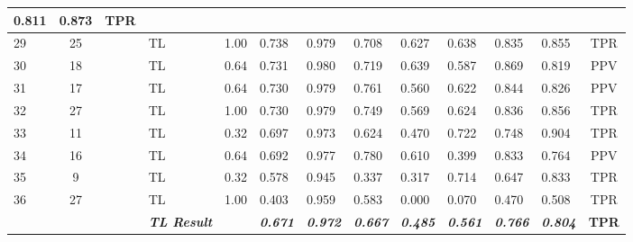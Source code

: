 \begin{table}[H]
{\begin{tabular}{lcc|l|c|l|l|l|l|l|l|l|c|}
    0.811 &
    0.873 &
    TPR \\ \hline
  \multicolumn{1}{|l|}{29} &
    \multicolumn{1}{c|}{25} &
    \cellcolor[HTML]{00A9CE}{\color[HTML]{FFFFFF} RB} &
    TL &
    1.00 &
    0.738 &
    0.979 &
    0.708 &
    0.627 &
    0.638 &
    0.835 &
    0.855 &
    TPR \\ \hline
  \multicolumn{1}{|l|}{30} &
    \multicolumn{1}{c|}{18} &
    \cellcolor[HTML]{00A9CE}{\color[HTML]{FFFFFF} RB} &
    TL &
    0.64 &
    0.731 &
    0.980 &
    0.719 &
    0.639 &
    0.587 &
    0.869 &
    0.819 &
    PPV \\ \hline
  \multicolumn{1}{|l|}{31} &
    \multicolumn{1}{c|}{17} &
    \cellcolor[HTML]{00A9CE}{\color[HTML]{FFFFFF} RB} &
    TL &
    0.64 &
    0.730 &
    0.979 &
    0.761 &
    0.560 &
    0.622 &
    0.844 &
    0.826 &
    PPV \\ \hline
  \multicolumn{1}{|l|}{32} &
    \multicolumn{1}{c|}{27} &
    \cellcolor[HTML]{00A9CE}{\color[HTML]{FFFFFF} RB} &
    TL &
    1.00 &
    0.730 &
    0.979 &
    0.749 &
    0.569 &
    0.624 &
    0.836 &
    0.856 &
    TPR \\ \hline
  \multicolumn{1}{|l|}{33} &
    \multicolumn{1}{c|}{11} &
    \cellcolor[HTML]{00A9CE}{\color[HTML]{FFFFFF} RB} &
    TL &
    0.32 &
    0.697 &
    0.973 &
    0.624 &
    0.470 &
    0.722 &
    0.748 &
    0.904 &
    TPR \\ \hline
  \multicolumn{1}{|l|}{34} &
    \multicolumn{1}{c|}{16} &
    \cellcolor[HTML]{00A9CE}{\color[HTML]{FFFFFF} RB} &
    TL &
    0.64 &
    0.692 &
    0.977 &
    0.780 &
    0.610 &
    0.399 &
    0.833 &
    0.764 &
    PPV \\ \hline
  \multicolumn{1}{|l|}{35} &
    \multicolumn{1}{c|}{9} &
    \cellcolor[HTML]{00A9CE}{\color[HTML]{FFFFFF} RB} &
    TL &
    0.32 &
    0.578 &
    0.945 &
    0.337 &
    0.317 &
    0.714 &
    0.647 &
    0.833 &
    TPR \\ \hline
  \multicolumn{1}{|l|}{36} &
    \multicolumn{1}{c|}{27} &
    \cellcolor[HTML]{00A9CE}{\color[HTML]{FFFFFF} RB} &
    TL &
    1.00 &
    0.403 &
    0.959 &
    0.583 &
    0.000 &
    0.070 &
    0.470 &
    0.508 &
    TPR \\ \hline
   &
     &
     &
    \textit{\textbf{TL Result}} &
     &
    \textit{\textbf{0.671}} &
    \textit{\textbf{0.972}} &
    \textit{\textbf{0.667}} &
    \textit{\textbf{0.485}} &
    \textit{\textbf{0.561}} &
    \textit{\textbf{0.766}} &
    \textit{\textbf{0.804}} &
    \textbf{TPR} \\ \hline

\end{tabular}}
\end{table}
